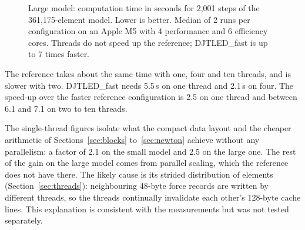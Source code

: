 \documentclass[11pt,a4paper]{article}
\newcommand{\DJF}{DJTLED\_fast}
\begin{document}
\begin{figure}[ht]
\centering
{}
\caption{Large model: computation time in seconds for 2,001 steps of the 361,175-element model. Lower is better. Median of 2 runs per configuration on an Apple M5 with 4 performance and 6 efficiency cores. Threads do not speed up the reference; \DJF{} is up to 7 times faster.}
\label{fig:large}
\end{figure}

The reference takes about the same time with one, four and ten threads, and is slower with two. \DJF{} needs 5.5\,s on one thread and 2.1\,s on four. The speed-up over the faster reference configuration is 2.5 on one thread and between 6.1 and 7.1 on two to ten threads.

The single-thread figures isolate what the compact data layout and the cheaper arithmetic of Sections~\ref{sec:blocks} to~\ref{sec:newton} achieve without any parallelism: a factor of 2.1 on the small model and 2.5 on the large one. The rest of the gain on the large model comes from parallel scaling, which the reference does not have there. The likely cause is its strided distribution of elements (Section~\ref{sec:threads}): neighbouring 48-byte force records are written by different threads, so the threads continually invalidate each other's 128-byte cache lines. This explanation is consistent with the measurements but was not tested separately.
\end{document}
